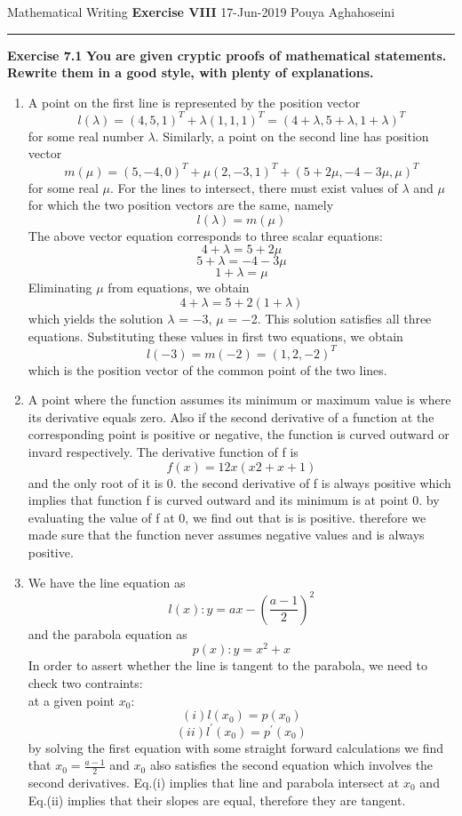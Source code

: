 \documentclass{article}
\begin{document}
	\noindent
	Mathematical Writing \hfill \textbf{Exercise VIII} \newline 
	{17-Jun-2019} \hfill Pouya Aghahoseini
	
	\noindent
	\rule{\linewidth}{0.4pt}
	\textbf{\large\color{blue} Exercise 7.1}   \textbf{You are given cryptic proofs of mathematical statements. Rewrite them
    in a good style, with plenty of explanations. }
	
	\begin{enumerate}
		\item 
        A point on the first line is represented by the position vector
        \[l(\lambda)=(4,5,1)^{T} + \lambda (1,1,1)^{T} = (4+\lambda,5+\lambda,1+\lambda)^{T} \]
        for some real number $\lambda$. Similarly, a point on the second line has position vector
        \[m(\mu)= (5, −4, 0)^{T} + \mu (2, −3, 1)^{T} + (5 + 2μ, −4 − 3μ, μ)^{T} \]
        for some real $\mu$. For the lines to intersect, there must exist values of $\lambda$ and $\mu$ for
        which the two position vectors are the same, namely
        \[ l(\lambda) = m(\mu) \]
        The above vector equation corresponds to three scalar equations:
        \[ 4 + \lambda = 5 + 2\mu \]
        \[ 5 + \lambda = -4 - 3\mu \]
        \[ 1 + \lambda = \mu \]
        Eliminating $\mu$ from equations, we obtain
        \[ 4 + \lambda = 5 + 2(1+\lambda) \]
        which yields the solution $\lambda$ = −3, $\mu$ = −2. This solution satisfies all three equations.
        Substituting these values in first two equations, we obtain
        \[ l(−3) = m(−2) = (1, 2, −2)^{T}\]
        which is the position vector of the common point of the two lines.
		\item 
        A point where the function assumes its minimum or maximum value is where its derivative equals zero.
        Also if the second derivative of a function at the corresponding point is positive or negative, the function is curved outward or invard respectively.
        The derivative function of f is 
        \[ f(x) = 12x(x2 + x + 1)\]
        and the only root of it is 0.
        the second derivative of f is always positive which implies that function f is curved outward and its minimum is at point 0.
        by evaluating the value of f at 0, we find out that is is positive.
        therefore we made sure that the function never assumes negative values and is always positive.
        \item 
        We have the line equation as
        \[ l(x): y = ax - (\frac{a-1}{2})^{2} \]
        and the parabola equation as
        \[ p(x): y = x^{2} + x\]
        In order to assert whether the line is tangent to the parabola, we need to check two contraints:\\
        at a given point $x_{0}$:
        $$(i) l(x_{0})=p(x_{0})$$
        $$(ii) l^{'}(x_{0})=p^{'}(x_{0})$$
        by solving the first equation with some straight forward calculations we find that $x_{0}=\frac{a-1}{2}$
        and $x_{0}$ also satisfies the second equation which involves the second derivatives.
        Eq.(i) implies that line and parabola intersect at $x_{0}$ and Eq.(ii) implies that their slopes are equal, therefore they are tangent.
	\end{enumerate}
	
\end{document}
